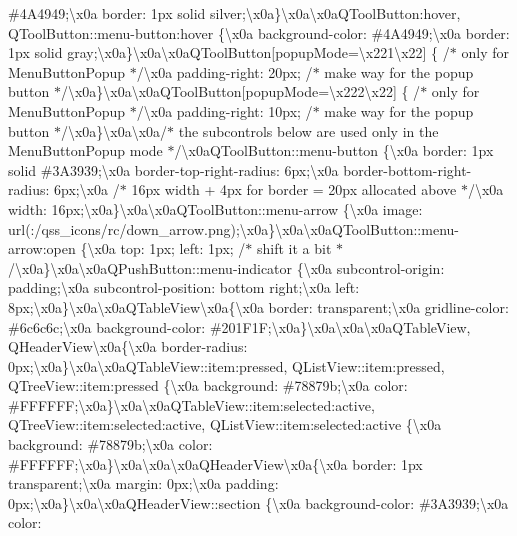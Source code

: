 \begin{DoxyCompactItemize}
\#4\+A4949;\textbackslash{}x0a border\+: 1px solid silver;\textbackslash{}x0a\}\textbackslash{}x0a\textbackslash{}x0a\+Q\+Tool\+Button\+:hover, Q\+Tool\+Button\+::menu-\/button\+:hover \{\textbackslash{}x0a background-\/color\+: \#4\+A4949;\textbackslash{}x0a border\+: 1px solid gray;\textbackslash{}x0a\}\textbackslash{}x0a\textbackslash{}x0a\+Q\+Tool\+Button\mbox{[}popup\+Mode=\textbackslash{}x221\textbackslash{}x22\mbox{]} \{ /$\ast$ only for Menu\+Button\+Popup $\ast$/\textbackslash{}x0a padding-\/right\+: 20px; /$\ast$ make way for the popup button $\ast$/\textbackslash{}x0a\}\textbackslash{}x0a\textbackslash{}x0a\+Q\+Tool\+Button\mbox{[}popup\+Mode=\textbackslash{}x222\textbackslash{}x22\mbox{]} \{ /$\ast$ only for Menu\+Button\+Popup $\ast$/\textbackslash{}x0a padding-\/right\+: 10px; /$\ast$ make way for the popup button $\ast$/\textbackslash{}x0a\}\textbackslash{}x0a\textbackslash{}x0a/$\ast$ the subcontrols below are used only in the Menu\+Button\+Popup mode $\ast$/\textbackslash{}x0a\+Q\+Tool\+Button\+::menu-\/button \{\textbackslash{}x0a border\+: 1px solid \#3\+A3939;\textbackslash{}x0a border-\/top-\/right-\/radius\+: 6px;\textbackslash{}x0a border-\/bottom-\/right-\/radius\+: 6px;\textbackslash{}x0a /$\ast$ 16px width + 4px for border = 20px allocated above $\ast$/\textbackslash{}x0a width\+: 16px;\textbackslash{}x0a\}\textbackslash{}x0a\textbackslash{}x0a\+Q\+Tool\+Button\+::menu-\/arrow \{\textbackslash{}x0a image\+: url(\+:/qss\+\_\+icons/rc/down\+\_\+arrow.\+png);\textbackslash{}x0a\}\textbackslash{}x0a\textbackslash{}x0a\+Q\+Tool\+Button\+::menu-\/arrow\+:open \{\textbackslash{}x0a top\+: 1px; left\+: 1px; /$\ast$ shift it a bit $\ast$/\textbackslash{}x0a\}\textbackslash{}x0a\textbackslash{}x0a\+Q\+Push\+Button\+::menu-\/indicator \{\textbackslash{}x0a subcontrol-\/origin\+: padding;\textbackslash{}x0a subcontrol-\/position\+: bottom right;\textbackslash{}x0a left\+: 8px;\textbackslash{}x0a\}\textbackslash{}x0a\textbackslash{}x0a\+Q\+Table\+View\textbackslash{}x0a\{\textbackslash{}x0a border\+: transparent;\textbackslash{}x0a gridline-\/color\+: \#6c6c6c;\textbackslash{}x0a background-\/color\+: \#201\+F1\+F;\textbackslash{}x0a\}\textbackslash{}x0a\textbackslash{}x0a\textbackslash{}x0a\+Q\+Table\+View, Q\+Header\+View\textbackslash{}x0a\{\textbackslash{}x0a border-\/radius\+: 0px;\textbackslash{}x0a\}\textbackslash{}x0a\textbackslash{}x0a\+Q\+Table\+View\+::item\+:pressed, Q\+List\+View\+::item\+:pressed, Q\+Tree\+View\+::item\+:pressed \{\textbackslash{}x0a background\+: \#78879b;\textbackslash{}x0a color\+: \#\+F\+F\+F\+F\+F\+F;\textbackslash{}x0a\}\textbackslash{}x0a\textbackslash{}x0a\+Q\+Table\+View\+::item\+:selected\+:active, Q\+Tree\+View\+::item\+:selected\+:active, Q\+List\+View\+::item\+:selected\+:active \{\textbackslash{}x0a background\+: \#78879b;\textbackslash{}x0a color\+: \#\+F\+F\+F\+F\+F\+F;\textbackslash{}x0a\}\textbackslash{}x0a\textbackslash{}x0a\textbackslash{}x0a\+Q\+Header\+View\textbackslash{}x0a\{\textbackslash{}x0a border\+: 1px transparent;\textbackslash{}x0a margin\+: 0px;\textbackslash{}x0a padding\+: 0px;\textbackslash{}x0a\}\textbackslash{}x0a\textbackslash{}x0a\+Q\+Header\+View\+::section \{\textbackslash{}x0a background-\/color\+: \#3\+A3939;\textbackslash{}x0a color\+: 
\end{DoxyCompactItemize}
